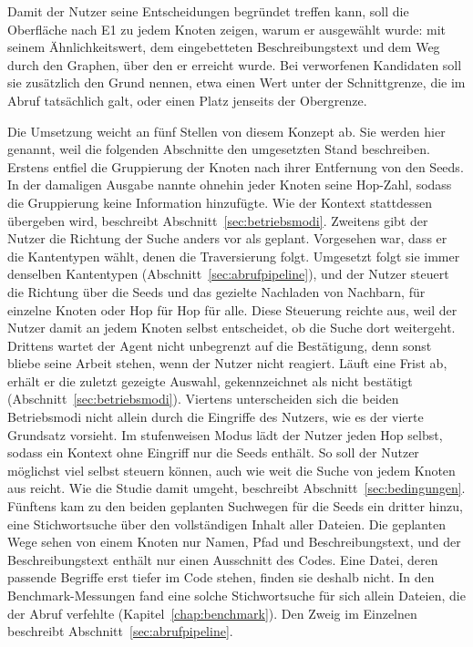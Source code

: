 Damit der Nutzer seine Entscheidungen begründet treffen kann, soll die Oberfläche nach E1 zu jedem Knoten zeigen, warum er ausgewählt wurde: mit seinem Ähnlichkeitswert, dem eingebetteten Beschreibungstext und dem Weg durch den Graphen, über den er erreicht wurde. Bei verworfenen Kandidaten soll sie zusätzlich den Grund nennen, etwa einen Wert unter der Schnittgrenze, die im Abruf tatsächlich galt, oder einen Platz jenseits der Obergrenze.

Die Umsetzung weicht an fünf Stellen von diesem Konzept ab. Sie werden hier genannt, weil die folgenden Abschnitte den umgesetzten Stand beschreiben. Erstens entfiel die Gruppierung der Knoten nach ihrer Entfernung von den Seeds. In der damaligen Ausgabe nannte ohnehin jeder Knoten seine Hop-Zahl, sodass die Gruppierung keine Information hinzufügte. Wie der Kontext stattdessen übergeben wird, beschreibt Abschnitt~\ref{sec:betriebsmodi}. Zweitens gibt der Nutzer die Richtung der Suche anders vor als geplant. Vorgesehen war, dass er die Kantentypen wählt, denen die Traversierung folgt. Umgesetzt folgt sie immer denselben Kantentypen (Abschnitt~\ref{sec:abrufpipeline}), und der Nutzer steuert die Richtung über die Seeds und das gezielte Nachladen von Nachbarn, für einzelne Knoten oder Hop für Hop für alle. Diese Steuerung reichte aus, weil der Nutzer damit an jedem Knoten selbst entscheidet, ob die Suche dort weitergeht. Drittens wartet der Agent nicht unbegrenzt auf die Bestätigung, denn sonst bliebe seine Arbeit stehen, wenn der Nutzer nicht reagiert. Läuft eine Frist ab, erhält er die zuletzt gezeigte Auswahl, gekennzeichnet als nicht bestätigt (Abschnitt~\ref{sec:betriebsmodi}). Viertens unterscheiden sich die beiden Betriebsmodi nicht allein durch die Eingriffe des Nutzers, wie es der vierte Grundsatz vorsieht. Im stufenweisen Modus lädt der Nutzer jeden Hop selbst, sodass ein Kontext ohne Eingriff nur die Seeds enthält. So soll der Nutzer möglichst viel selbst steuern können, auch wie weit die Suche von jedem Knoten aus reicht. Wie die Studie damit umgeht, beschreibt Abschnitt~\ref{sec:bedingungen}. Fünftens kam zu den beiden geplanten Suchwegen für die Seeds ein dritter hinzu, eine Stichwortsuche über den vollständigen Inhalt aller Dateien. Die geplanten Wege sehen von einem Knoten nur Namen, Pfad und Beschreibungstext, und der Beschreibungstext enthält nur einen Ausschnitt des Codes. Eine Datei, deren passende Begriffe erst tiefer im Code stehen, finden sie deshalb nicht. In den Benchmark-Messungen fand eine solche Stichwortsuche für sich allein Dateien, die der Abruf verfehlte (Kapitel~\ref{chap:benchmark}). Den Zweig im Einzelnen beschreibt Abschnitt~\ref{sec:abrufpipeline}.

